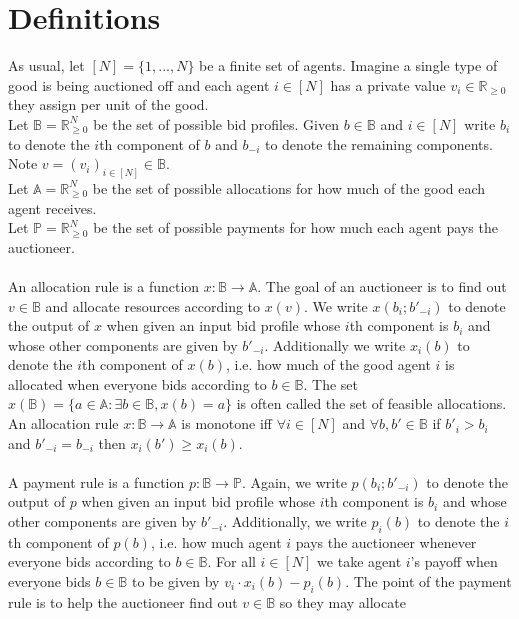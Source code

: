 \documentclass[11pt]{article}
\title{}
\date{}
\theoremstyle{definition}
\theoremstyle{plain}
\begin{document}
\section{Definitions}
As usual, let $[N]=\{1,...,N\}$ be a finite set of agents. Imagine a single type of
good is being auctioned off and each agent $i \in [N]$ has a private value $v_i \in
\mathbb {R}_{\geq 0}$ they assign per unit of the good.
\\
Let $\mathbb{B}=\mathbb{R}_{\geq 0}^N$ be the set of possible bid profiles. Given
$b \in \mathbb{B}$ and $i \in [N]$ write $b_i$ to denote the $i$th component of $b$
and $b_{-i}$ to denote the remaining components. Note $v=(v_i)_{i \in [N]}\in \mathbb{B}$.
\\
Let $\mathbb{A}=\mathbb{R}_{\geq 0}^N$ be the set of possible allocations for how
much of the good each agent receives.
\\
Let $\mathbb{P}=\mathbb{R}_{\geq 0}^N$ be the set of possible payments for how much
each agent pays the auctioneer.
\\
\\
An allocation rule is a function $x: \mathbb{B} \to \mathbb{A}$. The goal of an
auctioneer is to find out $v \in \mathbb{B}$ and allocate resources according to
$x(v)$. We write $x(b_i;b'_{-i})$ to denote the output of $x$ when given an input
bid profile whose $i$th component is $b_i$ and whose other components are given by
$b'_{-i}.$ Additionally we write $x_i(b)$ to denote the $i$th component of $x(b)$,
i.e. how much of the good agent $i$ is allocated when everyone bids according to $b
\in \mathbb{B}.$ The set $x(\mathbb{B})=\{a \in \mathbb{A} : \exists b \in
\mathbb{B}, x(b)=a\}$ is often called the set of feasible allocations. An
allocation rule $x: \mathbb{B} \to \mathbb{A}$ is monotone iff $\forall i \in [N]$
and $\forall b,b' \in \mathbb{B}$ if $b'_i > b_i$ and $b'_{-i}=b_{-i}$ then
$x_i(b') \geq x_i(b)$.
\\
\\
A payment rule is a function $p: \mathbb{B} \to \mathbb{P}$. Again, we write
$p(b_i;b'_{-i})$ to denote the output of $p$ when given an input bid profile whose
$i$th component is $b_i$ and whose other components are given by $b'_{-i}$.
Additionally, we write $p_i(b)$ to denote the $i$th component of $p(b)$, i.e. how
much agent $i$ pays the auctioneer whenever everyone bids according to $b\in
\mathbb{B}.$ For all $i \in [N]$ we take agent $i$'s payoff when everyone bids $b
\in \mathbb{B}$ to be given by $v_i \cdot x_i(b)-p_i(b)$. The point of the payment
rule is to help the auctioneer find out $v \in \mathbb{B}$ so they may allocate
\end{document}
